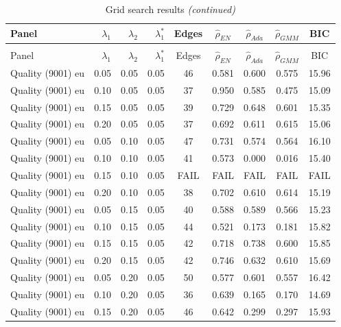 \begingroup\fontsize{8}{10}\selectfont

\begin{longtable}[t]{lrrrccccc}
\caption{\label{tab:grid-summary-appendix}Grid search results}\\
\toprule
Panel & $\lambda_1$ & $\lambda_2$ & $\lambda_1^*$ & Edges & $\hat{\rho}_{EN}$ & $\hat{\rho}_{Ada}$ & $\hat{\rho}_{GMM}$ & BIC\\
\midrule
\endfirsthead
\caption[]{Grid search results \textit{(continued)}}\\
\toprule
Panel & $\lambda_1$ & $\lambda_2$ & $\lambda_1^*$ & Edges & $\hat{\rho}_{EN}$ & $\hat{\rho}_{Ada}$ & $\hat{\rho}_{GMM}$ & BIC\\
\midrule
\endhead

\endfoot
\bottomrule
\endlastfoot
Quality (9001) eu & 0.05 & 0.05 & 0.05 & 46 & 0.581 & 0.600 & 0.575 & 15.96\\
Quality (9001) eu & 0.10 & 0.05 & 0.05 & 37 & 0.950 & 0.585 & 0.475 & 15.09\\
Quality (9001) eu & 0.15 & 0.05 & 0.05 & 39 & 0.729 & 0.648 & 0.601 & 15.35\\
Quality (9001) eu & 0.20 & 0.05 & 0.05 & 37 & 0.692 & 0.611 & 0.615 & 15.06\\
Quality (9001) eu & 0.05 & 0.10 & 0.05 & 47 & 0.731 & 0.574 & 0.564 & 16.10\\
\addlinespace
Quality (9001) eu & 0.10 & 0.10 & 0.05 & 41 & 0.573 & 0.000 & 0.016 & 15.40\\
Quality (9001) eu & 0.15 & 0.10 & 0.05 & FAIL & FAIL & FAIL & FAIL & FAIL\\
Quality (9001) eu & 0.20 & 0.10 & 0.05 & 38 & 0.702 & 0.610 & 0.614 & 15.19\\
Quality (9001) eu & 0.05 & 0.15 & 0.05 & 40 & 0.588 & 0.589 & 0.566 & 15.23\\
Quality (9001) eu & 0.10 & 0.15 & 0.05 & 44 & 0.521 & 0.173 & 0.181 & 15.82\\
\addlinespace
Quality (9001) eu & 0.15 & 0.15 & 0.05 & 42 & 0.718 & 0.738 & 0.600 & 15.85\\
Quality (9001) eu & 0.20 & 0.15 & 0.05 & 42 & 0.746 & 0.632 & 0.610 & 15.69\\
Quality (9001) eu & 0.05 & 0.20 & 0.05 & 50 & 0.577 & 0.601 & 0.557 & 16.42\\
Quality (9001) eu & 0.10 & 0.20 & 0.05 & 36 & 0.639 & 0.165 & 0.170 & 14.69\\
Quality (9001) eu & 0.15 & 0.20 & 0.05 & 46 & 0.642 & 0.299 & 0.297 & 15.93\\

\end{longtable}
